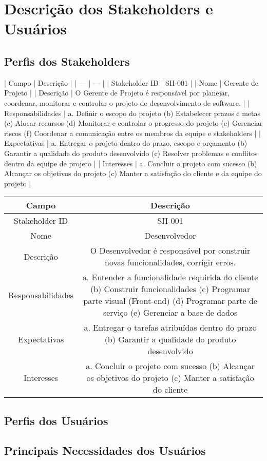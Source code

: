\chapter{Descrição dos Stakeholders e Usuários}

\section{Perfis dos Stakeholders}

\begin{markdown}
| Campo | Descrição |
| --- | --- |
| Stakeholder ID | SH-001 |
| Nome | Gerente de Projeto |
| Descrição | O Gerente de Projeto é responsável por planejar, coordenar, monitorar e controlar o projeto de desenvolvimento de software. |
| Responsabilidades | a. Definir o escopo do projeto (b) Estabelecer prazos e metas (c) Alocar recursos (d) Monitorar e controlar o progresso do projeto (e) Gerenciar riscos (f) Coordenar a comunicação entre os membros da equipe e stakeholders |
| Expectativas | a. Entregar o projeto dentro do prazo, escopo e orçamento (b) Garantir a qualidade do produto desenvolvido (c) Resolver problemas e conflitos dentro da equipe de projeto |
| Interesses | a. Concluir o projeto com sucesso (b) Alcançar os objetivos do projeto (c) Manter a satisfação do cliente e da equipe do projeto |

\end{markdown}

\begin{table}[!ht]
    \centering
    \begin{tabular}{|c|c|}
        Campo & Descrição \\ \hline
        Stakeholder ID & SH-001 \\ 
        Nome & Desenvolvedor \\ 
        Descrição & O Desenvolvedor é responsável por construir novas funcionalidades, corrigir erros. \\ 
        Responsabilidades & a. Entender a funcionalidade requirida do cliente (b) Construir funcionalidades (c) Programar parte visual (Front-end) (d) Programar parte de serviço (e) Gerenciar a base de dados \\ 
        Expectativas & a. Entregar o tarefas atribuídas dentro do prazo (b) Garantir a qualidade do produto desenvolvido \\ 
        Interesses & a. Concluir o projeto com sucesso (b) Alcançar os objetivos do projeto (c) Manter a satisfação do cliente \\ 
    \end{tabular}
\end{table}

\section{Perfis dos Usuários}
\section{Principais Necessidades dos Usuários}
